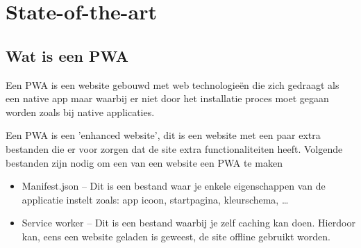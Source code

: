 \section{State-of-the-art}
\label{sec:state-of-the-art}
\subsection{Wat is een PWA}

Een PWA is een website gebouwd met web technologieën die zich gedraagt als een native app maar waarbij er niet door het installatie proces moet gegaan worden zoals bij native applicaties.
\autocite{Sayali2018}

Een PWA is een 'enhanced website', dit is een website met een paar extra bestanden die er voor zorgen dat de site extra functionaliteiten heeft. Volgende bestanden zijn nodig om een van een website een PWA te maken
\begin{itemize}
    \item Manifest.json – Dit is een bestand waar je enkele eigenschappen van de applicatie instelt zoals: app icoon, startpagina, kleurschema, …
    \item Service worker – Dit is een bestand waarbij je zelf caching kan doen. Hierdoor kan, eens een website geladen is geweest, de site offline gebruikt worden.
\end{itemize}
\autocite{Harris2017}

